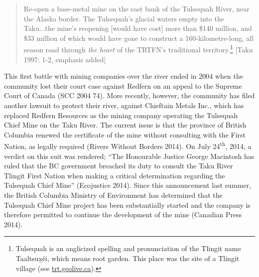 \begin{quote}
Re-open a base-metal mine on the east bank of the Tulsequah River, near the Alaska border. The Tulsequah’s glacial waters empty into the Taku...the mine’s reopening [would have cost] more than \$140 million, and \$33 million of which would have gone to construct a 160-kilometre-long, all season road through \textit{the heart} of the TRTFN’s traditional territory.\footnote{Tulsequah is an anglicized spelling and pronunciation of the Tlingit name Taaltsux̲éi, which means root garden. This place was the site of a Tlingit village (see \url{trt.geolive.ca}). } [Taku 1997: 1-2, emphasis added]
\end{quote}

This first battle with mining companies over the river ended in 2004 when the community lost their court case against Redfern on an appeal to the Supreme Court of Canada (SCC 2004 74). More recently, however, the community has filed another lawsuit to protect their river, against Chieftain Metals Inc., which has replaced Redfern Resources as the mining company operating the Tulsequah Chief Mine on the Taku River. The current issue is that the province of British Columbia renewed the certificate of the mine without consulting with the First Nation, as legally required (Rivers Without Borders 2014). On July 24\textsuperscript{th}, 2014, a verdict on this suit was rendered; “The Honourable Justice George Macintosh has ruled that the BC government breached its duty to consult the Taku River Tlingit First Nation when making a critical determination regarding the Tulsequah Chief Mine” (Ecojustice 2014). Since this announcement last summer, the British Columbia Ministry of Environment has determined that the Tulsequah Chief Mine project has been substantially started and the company is therefore permitted to continue the development of the mine (Canadian Press 2014).

